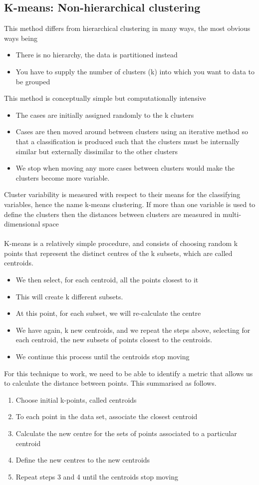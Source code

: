 \subsection{K-means: Non-hierarchical clustering}
This method differs from hierarchical clustering in many ways, the most obvious ways being 
\begin{itemize}
    \item There is no hierarchy, the data is partitioned instead
    \item You have to supply the number of clusters (k) into which you want to data to be grouped
\end{itemize}
This method is conceptually simple but computationally intensive
\begin{itemize}
    \item The cases are initially assigned randomly to the k clusters
    \item Cases are then moved around between clusters using an iterative method so that a classification is produced such that the clusters must be internally similar but externally dissimilar to the other clusters
    \item We stop when moving any more cases between clusters would make the clusters become more variable.
\end{itemize}
Cluster variability is measured with respect to their means for the classifying variables, hence the name k-means clustering. If more than one variable is used to define the clusters then the distances between clusters are measured in multi-dimensional space
\\\\
K-means is a relatively simple procedure, and consists of
choosing random k points that represent the distinct centres
of the k subsets, which are called centroids.
\begin{itemize}
    \item We then select, for each centroid, all the points closest to it
    \item This will create k different subsets.
    \item At this point, for each subset, we will re-calculate the centre
    \item We have again, k new centroids, and we repeat the steps above, selecting for each centroid, the new subsets of points closest to the centroids.
    \item  We continue this process until the centroids stop moving
\end{itemize}
For this technique to work, we need to be able to identify a metric that allows us to calculate the distance between points. This summarised as follows.
\begin{enumerate}
    \item Choose initial k-points, called centroids
    \item To each point in the data set, associate the closest centroid
    \item Calculate the new centre for the sets of points associated to a particular centroid
    \item Define the new centres to the new centroids
    \item Repeat steps 3 and 4 until the centroids stop moving
\end{enumerate}
